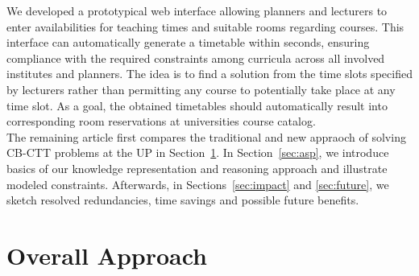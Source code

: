 \documentclass{easychair}
\newcommand{\CBCTT}{CB-CTT}
\newcommand{\UP}{UP}
\begin{document}
  We developed a prototypical web interface allowing planners and lecturers to enter availabilities for teaching times and suitable rooms regarding courses. 
  This interface can automatically generate a timetable within seconds, ensuring compliance with the required constraints among curricula across all  involved institutes and planners. 
  The idea is to find a solution from the time slots specified by lecturers rather than permitting any course to potentially take place at any time slot.
  As a goal, the obtained timetables should automatically result into corresponding room reservations at universities course catalog. \\
  The remaining article first compares the traditional and new appraoch of solving \CBCTT{} problems at the \UP{} in Section~\ref{sec:approach}. 
  In Section~\ref{sec:asp}, we introduce basics of our knowledge representation and reasoning approach and illustrate modeled constraints. 
  Afterwards, in Sections~\ref{sec:impact} and \ref{sec:future}, we sketch resolved redundancies, time savings and possible future benefits.


\section{Overall Approach}
\label{sec:approach}
\end{document}
